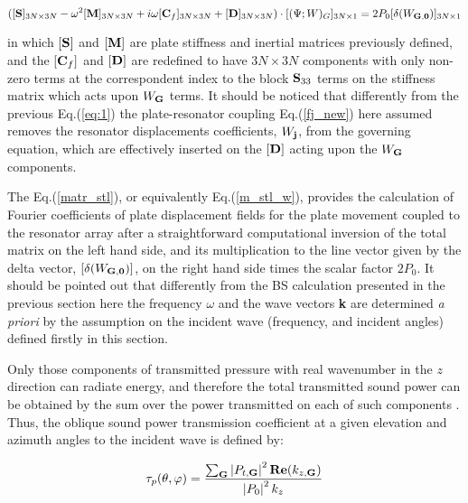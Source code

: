 \documentclass[a4paper]{ICEDyn}
\begin{document}
	\begin{equation}
	\label{m_stl_w}
	([{\bf S}]_{3N \times 3N}- \omega^2[{\bf M}]_{3N \times 3N}
    +i\omega[{\bf C}_f]_{3N \times 3N}+[{\bf D}]_{3N \times 3N})\cdot[ (\Psi; W)_G]_{3N \times 1} 
    =2P_0 [\delta(W_{\bf G,0})]_{3N \times 1} 
	\end{equation}
    	
in which $[{\bf S}]$ and $[{\bf M}]$ are plate stiffness and inertial matrices previously defined, and the $[{\bf C}_f]$ and $[{\bf D}]$ are redefined to have $3N \times 3N$ components with only non-zero terms at the correspondent index to the block ${\bf S}_{33}$ terms on the stiffness matrix which acts upon $W_{\bf G}$ terms. It should be noticed that differently from the previous Eq.(\ref{eq:1}) the plate-resonator coupling Eq.(\ref{fj_new}) here assumed removes the resonator displacements coefficients, $W_{\bf j}$, from the governing equation, which are effectively inserted on the $[{\bf D}]$ acting upon the $W_{\bf G}$ components.

    \vspace{0.5cm}    
    The Eq.(\ref{matr_stl}), or equivalently Eq.(\ref{m_stl_w}), provides the calculation of Fourier coefficients of plate displacement fields for the plate movement coupled to the resonator array after a straightforward computational inversion of the total matrix on the left hand side, and its multiplication to the line vector given by the delta vector, $[\delta(W_{\bf G,0})]$, on the right hand side  times the scalar factor $2P_0$. It should be pointed out that differently from the BS calculation presented in the previous section here the frequency $\omega$ and the wave vectors {\bf k} are determined {\it a priori} by the assumption on the incident wave (frequency, and incident angles) defined firstly in this section.
    
    \vspace{0.5cm}
Only those components of transmitted pressure with real wavenumber in the $z$ direction can radiate energy, and therefore the total transmitted sound power can be obtained by the sum over the power transmitted on each of such components \cite{Xiao2012s}. Thus, the oblique sound power transmission coefficient at a given elevation and azimuth angles to the incident wave is defined by:
	
	\begin{equation}
	\tau_{p}(\theta,\varphi) = \frac{\sum_{{\bf G}} \left|P_{t,{\bf G}}\right|^2 {\bf Re}(k_{z,{\bf G}})}{\left|P_{0} \right|^2 k_{z} }
	\end{equation}
\end{document}
